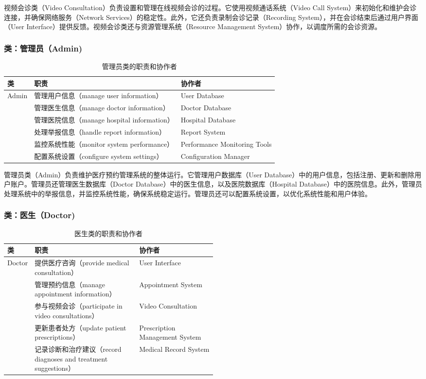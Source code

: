 视频会诊类（Video Consultation）负责设置和管理在线视频会诊的过程。它使用视频通话系统（Video Call System）来初始化和维护会诊连接，并确保网络服务（Network Services）的稳定性。此外，它还负责录制会诊记录（Recording System），并在会诊结束后通过用户界面（User Interface）提供反馈。视频会诊类还与资源管理系统（Resource Management System）协作，以调度所需的会诊资源。

\subsubsection{类：管理员（Admin)}
\begin{table}[htbp]
	\centering
	\begin{tabular}{|l|l|l|}
		\hline
		\textbf{类} & \textbf{职责} & \textbf{协作者} \\
		\hline
		Admin & 管理用户信息（manage user information） & User Database \\
		& 管理医生信息（manage doctor information） & Doctor Database \\
		& 管理医院信息（manage hospital information） & Hospital Database \\
		& 处理举报信息（handle report information） & Report System \\
		& 监控系统性能（monitor system performance） & Performance Monitoring Tools \\
		& 配置系统设置（configure system settings） & Configuration Manager \\
		\hline
	\end{tabular}
	\caption{管理员类的职责和协作者}
	\label{tab:admin}
\end{table}

管理员类（Admin）负责维护医疗预约管理系统的整体运行。它管理用户数据库（User Database）中的用户信息，包括注册、更新和删除用户账户。管理员还管理医生数据库（Doctor Database）中的医生信息，以及医院数据库（Hospital Database）中的医院信息。此外，管理员处理系统中的举报信息，并监控系统性能，确保系统稳定运行。管理员还可以配置系统设置，以优化系统性能和用户体验。

\subsubsection{类：医生（Doctor)}
\begin{table}[htbp]
	\centering
	\begin{tabular}{|l|p{0.5\linewidth}|l|}
		\hline
		\textbf{类} & \textbf{职责} & \textbf{协作者} \\
		\hline
		Doctor & 提供医疗咨询（provide medical consultation） & User Interface \\
		& 管理预约信息（manage appointment information） & Appointment System \\
		& 参与视频会诊（participate in video consultations） & Video Consultation \\
		& 更新患者处方（update patient prescriptions） & Prescription Management System \\
		& 记录诊断和治疗建议（record diagnoses and treatment suggestions） & Medical Record System \\
		\hline
	\end{tabular}
	\caption{医生类的职责和协作者}
	\label{tab:doctor}
\end{table}

